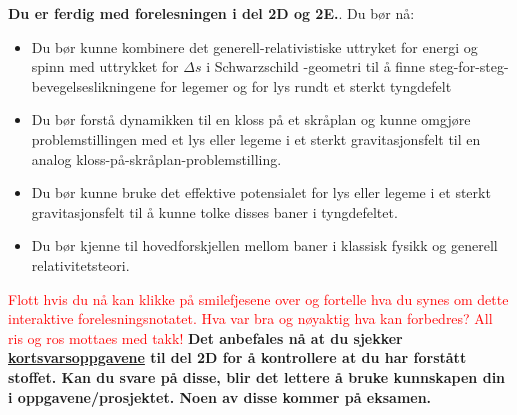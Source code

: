 \documentclass{beamer}
\let\hrefori\href
\renewcommand{\href}[2]{{\setlength{\fboxsep}{1pt}\colorbox{sunset}{\hrefori{#1}{#2}}}}
\renewcommand{\ss}{Schwarz\-schild }
\newcommand{\pagebutton}[1]{\setbeamertemplate{button}{\tikz\node[inner xsep = 5pt, draw = structure!90, fill = green(ryb), rounded corners = 8pt]{\color{amber}\Large\insertbuttontext};}\beamerbutton{#1}}
\begin{document}
\begin{frame}
{{\pagebutton{\small Forrige side}}\href{https://nettskjema.no/a/173961}{ \Changey[1][yellow]{-2}}
{\bf Du er ferdig med forelesningen i del 2D og 2E.}. Du bør nå:
\begin{itemize}
\item Du bør kunne kombinere det generell-relativistiske uttryket for energi og spinn med uttrykket for $\Delta s$ i \ss-geometri til å finne steg-for-steg-bevegelseslikningene for legemer og for lys rundt et sterkt tyngdefelt
\item Du bør forstå dynamikken til en kloss på et skråplan og kunne omgjøre problemstillingen med et lys eller legeme i et sterkt gravitasjonsfelt til en analog kloss-på-skråplan-problemstilling.
\item Du bør kunne bruke det effektive potensialet for lys eller legeme i et sterkt gravitasjonsfelt til å kunne tolke disses baner i tyngdefeltet.
\item Du bør kjenne til hovedforskjellen mellom baner i klassisk fysikk og generell relativitetsteori.
\end{itemize}
\textcolor{red}{Flott hvis du nå kan klikke på smilefjesene over og fortelle hva du synes om dette interaktive forelesningsnotatet. Hva var bra og nøyaktig hva kan forbedres? All ris og ros mottaes med takk!}
{\bf Det anbefales nå at du sjekker \href{https://www.uio.no/studier/emner/matnat/astro/AST2000/h21/undervisningsmateriell/kortsvarsoppgaver/del2d.pdf}{kortsvarsoppgavene} til del 2D for å kontrollere at du har forstått stoffet. Kan du svare på disse, blir det lettere å bruke kunnskapen din i oppgavene/prosjektet. Noen av disse kommer på eksamen.}
}



\end{frame}
\end{document}
